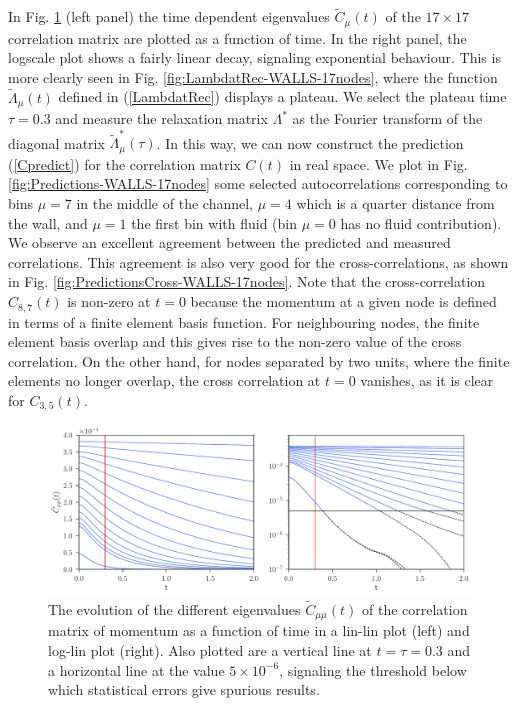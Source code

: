 \documentclass[a4paper,openright,12pt]{book}
\begin{document}
In  Fig.
\ref{fig:CtRec-WALLS-17nodes-exp}   (left   panel)   the   time   dependent   eigenvalues
$\tilde{C}_{\mu}(t)$  of  the  $17\times 17$  correlation  matrix  are
plotted as a function of time.  In the right panel, the logscale plot
shows a fairly linear decay, signaling exponential behaviour.  This is
more  clearly   seen  in   Fig. \ref{fig:LambdatRec-WALLS-17nodes},  where   the  function
$\tilde{\Lambda}_\mu(t)$  defined  in  (\ref{LambdatRec})  displays  a
plateau.   We select  the  plateau time  $\tau=0.3$  and measure  the
relaxation matrix $\Lambda^*$ as the Fourier transform of the diagonal
matrix  $\tilde{\Lambda}_{\mu}^*(\tau)$.   In  this way,  we  can  now
construct the  prediction (\ref{Cpredict}) for the  correlation matrix
$C(t)$ in real space. We  plot in Fig.  \ref{fig:Predictions-WALLS-17nodes} some selected
autocorrelations corresponding  to bins $\mu=7$  in the middle  of the
channel,  $\mu=4$ which  is  a  quarter distance  from  the wall,  and
$\mu=1$  the  first   bin  with  fluid  (bin  $\mu=0$   has  no  fluid
contribution).   We   observe  an  excellent  agreement   between  the
predicted and measured correlations.  This agreement is also very good
for the  cross-correlations, as shown in  Fig. \ref{fig:PredictionsCross-WALLS-17nodes}. Note
that the  cross-correlation $C_{8,7}(t)$ is non-zero  at $t=0$ because
the momentum at a  given node is defined in terms  of a finite element
basis  function.  For neighbouring  nodes,  the  finite element  basis
overlap  and this  gives  rise  to the  non-zero  value  of the  cross
correlation.  On  the other  hand, for nodes  separated by  two units,
where the finite elements no  longer overlap, the cross correlation at
$t=0$ vanishes, as it is clear for $C_{3,5}(t)$.



\begin{figure}[h!]
  \centering
  \includegraphics[scale=0.45]{CtRec-WALLS-17nodes-exp}
  \caption[Evolution of different eigenvalues $\tilde{C}_{\mu\nu}(t)$ for confined fluid - 17 nodes.]{
  The  evolution of  the different
  eigenvalues  $\tilde{C}_{\mu\mu}(t)$ of  the  correlation matrix  of
  momentum  as  a  function  of   time  in  a  lin-lin  plot  (left)
  and   log-lin   plot
  (right). Also  plotted are  a vertical line  at $t=\tau=0.3$  and a
  horizontal  line  at  the   value  $5\times10^{-6}$,  signaling  the
  threshold below which statistical errors give spurious results. }
\label{fig:CtRec-WALLS-17nodes-exp}
\end{figure}
\end{document}
